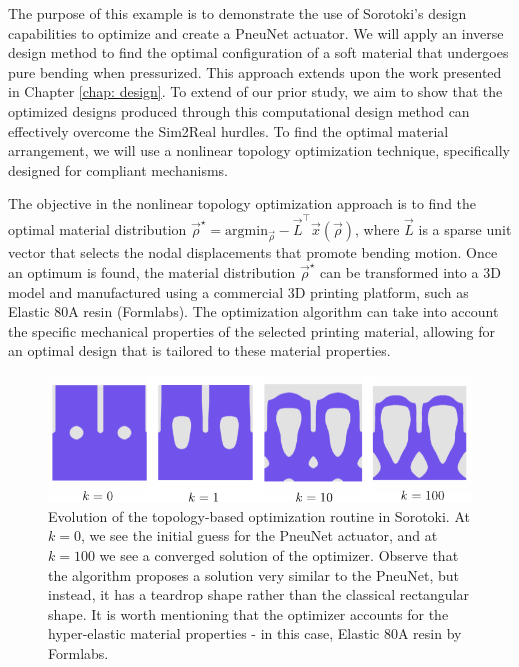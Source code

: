 The purpose of this example is to demonstrate the use of Sorotoki's design capabilities to optimize and create a PneuNet actuator. We will apply an inverse design method to find the optimal configuration of a soft material that undergoes pure bending when pressurized. This approach extends upon the work presented in Chapter \ref{chap: design}. To extend of our prior study, we aim to show that the optimized designs produced through this computational design method can effectively overcome the Sim2Real hurdles. To find the optimal material arrangement, we will use a nonlinear topology optimization technique, specifically designed for compliant mechanisms.

The objective in the nonlinear topology optimization approach is to find the optimal material distribution $\vec{\rho}^\star = \textrm{argmin}_{\vec{\rho}}  -\vec{L}^\top \vec{x}(\vec{\rho})$, where $\vec{L}$ is a sparse unit vector that selects the nodal displacements that promote bending motion. Once an optimum is found, the material distribution $\vec{\rho}^\star$ can be transformed into a 3D model and manufactured using a commercial 3D printing platform, such as Elastic 80A resin (Formlabs). The optimization algorithm can take into account the specific mechanical properties of the selected printing material, allowing for an optimal design that is tailored to these material properties.
%
\begin{figure}[!t]
    \vspace{-2mm}
    \centering
    \includegraphics*[width=.95\textwidth]{./pdf/thesis-figure-6-22.pdf}
    \caption{Evolution of the topology-based optimization routine in Sorotoki. At $k=0$, we see the initial guess for the PneuNet actuator, and at $k=100$ we see a converged solution of the optimizer. Observe that the algorithm proposes a solution very similar to the PneuNet, but instead, it has a teardrop shape rather than the classical rectangular shape. It is worth mentioning that the optimizer accounts for the hyper-elastic material properties - in this case, Elastic 80A resin by Formlabs.}
    \label{fig:C5:fig_optpneunet_solutions}
    \vspace{-3mm}
\end{figure}

